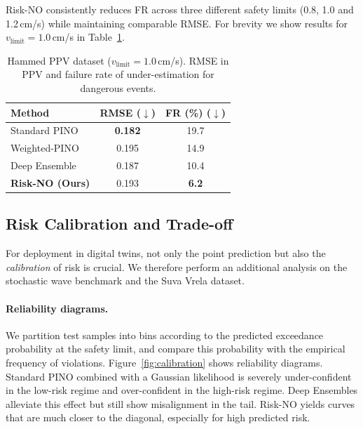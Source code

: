 \documentclass{article}
\theoremstyle{plain}
\theoremstyle{definition}
\theoremstyle{remark}
\begin{document}
Risk-NO consistently reduces FR across three different safety limits (0.8, 1.0 and 1.2\,cm/s) while maintaining comparable RMSE. For brevity we show results for $v_{\text{limit}}=1.0$\,cm/s in Table~\ref{tab:hammed}.

\begin{table}[t]
    \centering
    \caption{Hammed PPV dataset ($v_{\text{limit}}=1.0$\,cm/s). RMSE in PPV and failure rate of under-estimation for dangerous events.}
    \label{tab:hammed}
    \begin{tabular}{lcc}
        \toprule
        Method & RMSE ($\downarrow$) & FR (\%) ($\downarrow$) \\
        \midrule
        Standard PINO   & \textbf{0.182} & 19.7 \\
        Weighted-PINO   & 0.195 & 14.9 \\
        Deep Ensemble   & 0.187 & 10.4 \\
        \textbf{Risk-NO (Ours)} & 0.193 & \textbf{6.2} \\
        \bottomrule
    \end{tabular}
\end{table}

\subsection{Risk Calibration and Trade-off}

For deployment in digital twins, not only the point prediction but also the \emph{calibration} of risk is crucial. We therefore perform an additional analysis on the stochastic wave benchmark and the Suva Vrela dataset.

\paragraph{Reliability diagrams.}
We partition test samples into bins according to the predicted exceedance probability at the safety limit, and compare this probability with the empirical frequency of violations. Figure~\ref{fig:calibration} shows reliability diagrams. Standard PINO combined with a Gaussian likelihood is severely under-confident in the low-risk regime and over-confident in the high-risk regime. Deep Ensembles alleviate this effect but still show misalignment in the tail. Risk-NO yields curves that are much closer to the diagonal, especially for high predicted risk.
\end{document}
